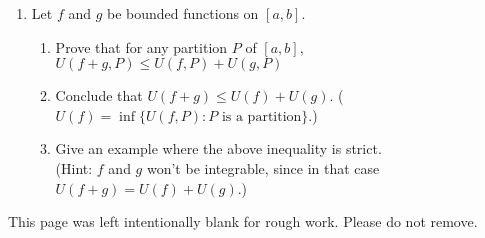 \documentclass[12pt]{article}
\newcommand{\points}[1]{\marginpar{\hspace{24pt}[#1]}}
\begin{document}
\begin{enumerate}
\begin{enumerate}
\end{enumerate}
\newpage

\item Let $f$ and $g$ be bounded functions on $[a,b]$.
\begin{enumerate}
 \item Prove that for any partition $P$ of $[a,b]$, $U(f+g,P)\leq U(f,P)+U(g,P)$ \points{5}

\vspace{3.5in}

 \item Conclude that $U(f+g)\leq U(f)+U(g)$. \points{3} ($U(f) = \inf\{U(f,P) : P \text{ is a partition}\}$.)

\vspace{2in}

 \item Give an example where the above inequality is strict. \points{2}\\
(Hint: $f$ and $g$ won't be integrable, since in that case $U(f+g)=U(f)+U(g)$.)
\end{enumerate}


\end{enumerate}
\newpage


This page was left intentionally blank for rough work. Please do not remove.
\end{document}
